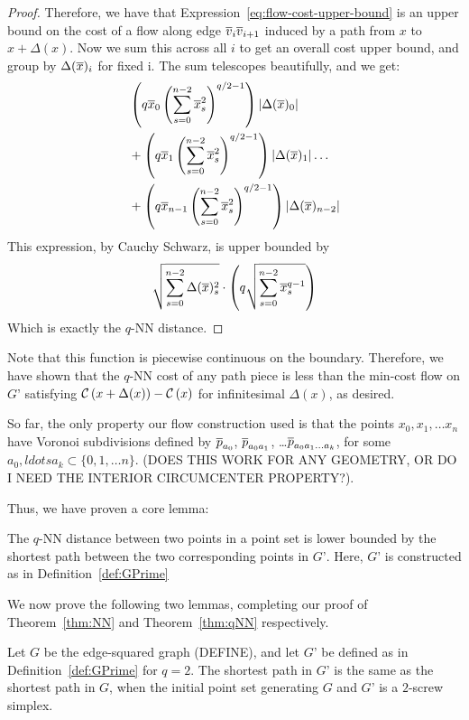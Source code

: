 \begin{proof}
Therefore, we have that Expression~\ref{eq:flow-cost-upper-bound} is an upper bound on the cost of
a flow along edge $\overline{v}_i\overline{v}_{i+1}$ induced by a path from $x$ to $x+\Delta(x)$. Now we sum this across all $i$ to get an overall cost upper bound, and group by
$\Delta(\overline{x})_i$ for fixed i. The sum telescopes beautifully, and we get:
\begin{align}
&\left(q\overline{x}_0\left(\sum_{s=0}^{n-2} \overline{x}_s^2\right)^{q/2-1}\right)| \Delta(\overline{x})_0|
\\&+
\left(q\overline{x}_1\left(\sum_{s=0}^{n-2} \overline{x}_s^2\right)^{q/2-1}\right)| \Delta(\overline{x})_1|
\ldots
\\& +
\left(q\overline{x}_{n-1}\left(\sum_{s=0}^{n-2} \overline{x}_s^2\right)^{q/2-1}\right)| \Delta(\overline{x})_{n-2}|
\end{align}
This expression, by Cauchy Schwarz, is upper bounded by
\[
\sqrt{\sum_{s=0}^{n-2} \Delta(\overline{x})_s^2} \cdot \left(q\sqrt{\sum_{s=0}^{n-2}
\overline{x}_s^{q-1}}\right)
\]
Which is exactly the $q$-NN distance.

\end{proof}

Note that this function is piecewise continuous on the boundary. Therefore,
we have shown that the $q$-NN cost of any path piece is less than the
min-cost flow on $G’$ satisfying
$\mathcal{C}\left(x+\Delta(x)\right)-\mathcal{C}\left(x\right)$ for infinitesimal
$\Delta(x)$, as desired.

So far, the only property our flow construction used is that the points
$x_0, x_1, \ldots x_n$ have Voronoi subdivisions defined by $\overline{p}_{a_0}$,
$\overline{p}_{a_0a_1}$, \ldots $\overline{p}_{a_0a_1\ldots a_k}$, for some $a_0, ldots a_k
\subset \{0, 1, \ldots n\}$. (DOES THIS WORK FOR ANY GEOMETRY, OR DO I NEED
THE INTERIOR CIRCUMCENTER PROPERTY?).

Thus, we have proven a core lemma:

\begin{lemma}\label{lem:qNN-GPrime}

The $q$-NN distance between two points in a point set is lower bounded by
the shortest path between the two corresponding points in $G’$. Here, $G’$
is constructed as in Definition~\ref{def:GPrime}

\end{lemma}

We now prove the following two lemmas, completing our proof of
Theorem~\ref{thm:NN} and Theorem~\ref{thm:qNN} respectively.

\begin{lemma}\label{lem:edge-squared-GPrime} Let $G$ be the edge-squared graph
(DEFINE), and let $G’$ be defined as in Definition~\ref{def:GPrime} for $q=2$.
The shortest path in $G’$ is the same as the shortest path in $G$, when the
initial point set generating $G$ and $G’$ is a $2$-screw simplex.

\end{lemma}

